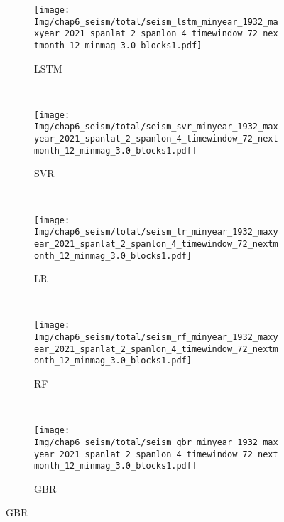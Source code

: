 \begin{figure}[!htbp]
  \vspace{-2cm}
  \centering
  \begin{subfigure}[b]{0.45\textwidth}
    \caption{LSTM}
    \texttt{[image: Img/chap6\_seism/total/seism\_lstm\_minyear\_1932\_maxyear\_2021\_spanlat\_2\_spanlon\_4\_timewindow\_72\_nextmonth\_12\_minmag\_3.0\_blocks1.pdf]}
    \vspace{-1cm}
    \label{fig:seism_lstm_minyear_1932_maxyear_2021_spanlat_2_spanlon_4_timewindow_72_nextmonth_12_minmag_3.0_blocks1}
  \end{subfigure}
  ~
  \begin{subfigure}[b]{0.45\textwidth}
    \caption{SVR} 
    \texttt{[image: Img/chap6\_seism/total/seism\_svr\_minyear\_1932\_maxyear\_2021\_spanlat\_2\_spanlon\_4\_timewindow\_72\_nextmonth\_12\_minmag\_3.0\_blocks1.pdf]}
    \vspace{-1cm}
    \label{fig:seism_svr_minyear_1932_maxyear_2021_spanlat_2_spanlon_4_timewindow_72_nextmonth_12_minmag_3.0_blocks1}
  \end{subfigure}   
  \\
  \begin{subfigure}[b]{0.45\textwidth}
      \caption{LR}
      \vspace{-0.2cm}
      \texttt{[image: Img/chap6\_seism/total/seism\_lr\_minyear\_1932\_maxyear\_2021\_spanlat\_2\_spanlon\_4\_timewindow\_72\_nextmonth\_12\_minmag\_3.0\_blocks1.pdf]}
      \vspace{-1cm}
      \label{fig:seism_lr_minyear_1932_maxyear_2021_spanlat_2_spanlon_4_timewindow_72_nextmonth_12_minmag_3.0_blocks1}
  \end{subfigure}
  ~
  \begin{subfigure}[b]{0.45\textwidth}
    \caption{RF}
    \vspace{-0.2cm}
    \texttt{[image: Img/chap6\_seism/total/seism\_rf\_minyear\_1932\_maxyear\_2021\_spanlat\_2\_spanlon\_4\_timewindow\_72\_nextmonth\_12\_minmag\_3.0\_blocks1.pdf]}
    \vspace{-1cm}
    \label{fig:seism_rf_minyear_1932_maxyear_2021_spanlat_2_spanlon_4_timewindow_72_nextmonth_12_minmag_3.0_blocks1}
  \end{subfigure}
  \\
  \begin{subfigure}[b]{0.45\textwidth}
    \caption{GBR}
    \vspace{-0.2cm}
    \texttt{[image: Img/chap6\_seism/total/seism\_gbr\_minyear\_1932\_maxyear\_2021\_spanlat\_2\_spanlon\_4\_timewindow\_72\_nextmonth\_12\_minmag\_3.0\_blocks1.pdf]}

\end{subfigure}
\end{figure}
